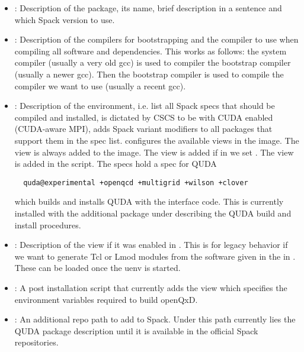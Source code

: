 \begin{itemize}
  \item {}: Description of the package, its name, brief description in a sentence and which Spack version to use.
  \item {}: Description of the compilers for bootstrapping and the compiler to use when compiling all software and dependencies. This works as follows: the system compiler (usually a very old gcc) is used to compiler the bootstrap compiler (usually a newer gcc). Then the bootstrap compiler is used to compile the compiler we want to use (usually a recent gcc).
  \item{: Description of the environment, i.e.  list all Spack specs that should be compiled and installed,  is dictated by CSCS to be  with CUDA enabled (CUDA-aware MPI),  adds Spack variant modifiers to all packages that support them in the spec list.  configures the available views in the image. The view  is always added to the image. The view  is added if in  we set . The  view is added in the  script. The specs hold a spec for QUDA
  \begin{verbatim}
  quda@experimental +openqcd +multigrid +wilson +clover
  \end{verbatim}
  which builds and installs QUDA with the interface code. This is currently installed with the additional package under  describing the QUDA build and install procedures. }
  \item {}: Description of the  view if it was enabled in . This is for legacy behavior if we want to generate Tcl\cite{online:tcl} or Lmod\cite{github:lmod} modules from the software given in the  in . These can be loaded once the uenv is started.
  \item {}: A post installation script that currently adds the  view which specifies the environment variables required to build openQxD.
  \item {}: An additional repo path to add to Spack. Under this path currently lies the QUDA package description until it is available in the official Spack repositories.
\end{itemize}

